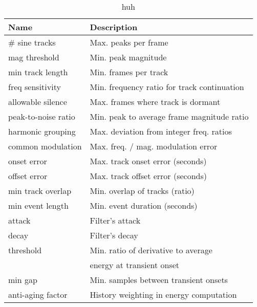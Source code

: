 \begin{table}[h]
\begin{center}
\begin{tabular}{|l|l|}
\hline
Name & Description \\ \hline
\# sine tracks & Max. peaks per frame\\
mag threshold & Min. peak magnitude\\ 
min track length & Min. frames per track\\
freq sensitivity & Min. frequency ratio for track continuation\\
allowable silence & Max. frames where track is dormant\\
peak-to-noise ratio & Min. peak to average frame magnitude ratio\\
\hline
harmonic grouping & Max. deviation from integer freq. ratios\\
common modulation & Max. freq. / mag. modulation error\\
onset error & Max. track onset error (seconds)\\
offset error & Max. track offset error (seconds)\\
min track overlap & Min. overlap of tracks (ratio)\\
min event length & Min. event duration (seconds)\\
\hline
attack & Filter's attack\\
decay & Filter's decay\\
threshold & Min. ratio of derivative to average\\
          & energy at transient onset\\
min gap & Min. samples between transient onsets\\
anti-aging factor & History weighting in energy computation\\
\hline
\end{tabular}
\caption{huh}
\label{tab:params1}
\end{center}
\end{table}
